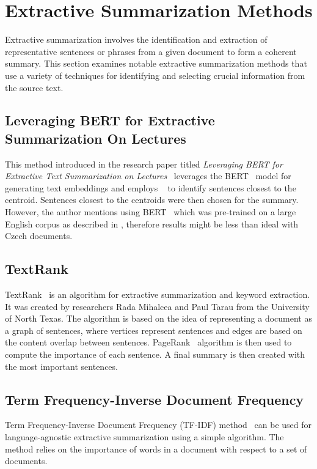 \documentclass[english, ba, kiv, he, iso690numb, pdf, viewonly]{fasthesis}
\begin{document}
	\section{Extractive Summarization Methods}
	Extractive summarization involves the identification and extraction of representative sentences or phrases from a given document to form a coherent summary. This section examines notable extractive summarization methods that use a variety of techniques for identifying and selecting crucial information from the source text.
	\subsection{Leveraging BERT for Extractive Summarization On Lectures} \label{bertlecturesummary}
	This method introduced in the research paper titled \textit{Leveraging BERT for Extractive Text Summarization on
		Lectures}~\cite{miller2019leveraging} leverages the BERT~\cite{devlin2019bert} model for generating text embeddings and employs ~\cite{Jin2010} to identify sentences closest to the centroid. Sentences closest to the centroids were then chosen for the summary. However, the author mentions using BERT~\cite{devlin2019bert} which was pre-trained on a large English corpus as described in \cite{devlin2019bert}, therefore results might be less than ideal with Czech documents.
	
	\subsection{TextRank}\label{textrank}
	TextRank~\cite{mihalcea-tarau-2004-textrank} is an algorithm for extractive summarization and keyword extraction. It was created by researchers Rada Mihalcea and Paul Tarau from the University of North Texas. The algorithm is based on the idea of representing a document as a graph of sentences, where vertices represent sentences and edges are based on the content overlap between sentences. PageRank~\cite{Page1999ThePC} algorithm is then used to compute the importance of each sentence. A final summary is then created with the most important sentences. 
	
	\subsection{Term Frequency-Inverse Document Frequency}
	Term Frequency-Inverse Document Frequency (TF-IDF) method~\cite{ChristianTFIDFSumm2016} can be used for language-agnostic extractive summarization using a simple algorithm. The method relies on the importance of words in a document with respect to a set of documents. 
\end{document}
